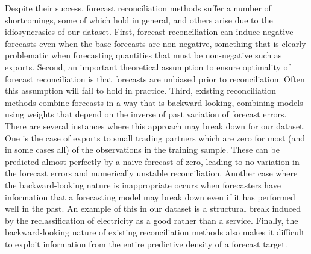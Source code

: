 \documentclass[a4paper,fleqn,11pt]{article}
\begin{document}
Despite their success, forecast reconciliation methods suffer a number of shortcomings, some of which hold in general, and others arise due to the idiosyncrasies of our dataset. First, forecast reconciliation can induce negative forecasts even when the base forecasts are non-negative, something that is clearly problematic when forecasting quantities that must be non-negative such as exports. Second, an important theoretical assumption to ensure optimality of forecast reconciliation is that forecasts are unbiased prior to reconciliation. Often this assumption will fail to hold in practice. Third, existing reconciliation methods combine forecasts in a way that is backward-looking, combining models using weights that depend on the inverse of past variation of forecast errors. There are several instances where this approach may break down for our dataset. One is the case of exports to small trading partners which are zero for most (and in some cases all) of the observations in the training sample. These can be predicted almost perfectly by a naive forecast of zero, leading to no variation in the forecast errors and numerically unstable reconciliation. Another case where the backward-looking nature is inappropriate occurs when forecasters have information that a forecasting model may break down even if it has performed well in the past. An example of this in our dataset is a structural break induced by the reclassification of electricity as a good rather than a service. Finally, the backward-looking nature of existing reconciliation methods also makes it difficult to exploit information from the entire predictive density of a forecast target.
\end{document}
